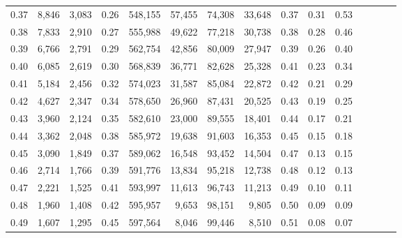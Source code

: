 \begin{tabular}{rrrcrrrrrrrrrrr}
0.37 &   8,846 &  3,083 &                                       0.26 &  548,155 &   57,455 &   74,308 &   33,648 &  0.37 &  0.31 &                         0.53 \\
0.38 &   7,833 &  2,910 &                                       0.27 &  555,988 &   49,622 &   77,218 &   30,738 &  0.38 &  0.28 &                         0.46 \\
0.39 &   6,766 &  2,791 &                                       0.29 &  562,754 &   42,856 &   80,009 &   27,947 &  0.39 &  0.26 &                         0.40 \\
0.40 &   6,085 &  2,619 &                                       0.30 &  568,839 &   36,771 &   82,628 &   25,328 &  0.41 &  0.23 &                         0.34 \\
0.41 &   5,184 &  2,456 &                                       0.32 &  574,023 &   31,587 &   85,084 &   22,872 &  0.42 &  0.21 &                         0.29 \\
0.42 &   4,627 &  2,347 &                                       0.34 &  578,650 &   26,960 &   87,431 &   20,525 &  0.43 &  0.19 &                         0.25 \\
0.43 &   3,960 &  2,124 &                                       0.35 &  582,610 &   23,000 &   89,555 &   18,401 &  0.44 &  0.17 &                         0.21 \\
0.44 &   3,362 &  2,048 &                                       0.38 &  585,972 &   19,638 &   91,603 &   16,353 &  0.45 &  0.15 &                         0.18 \\
0.45 &   3,090 &  1,849 &                                       0.37 &  589,062 &   16,548 &   93,452 &   14,504 &  0.47 &  0.13 &                         0.15 \\
0.46 &   2,714 &  1,766 &                                       0.39 &  591,776 &   13,834 &   95,218 &   12,738 &  0.48 &  0.12 &                         0.13 \\
0.47 &   2,221 &  1,525 &                                       0.41 &  593,997 &   11,613 &   96,743 &   11,213 &  0.49 &  0.10 &                         0.11 \\
0.48 &   1,960 &  1,408 &                                       0.42 &  595,957 &    9,653 &   98,151 &    9,805 &  0.50 &  0.09 &                         0.09 \\
0.49 &   1,607 &  1,295 &                                       0.45 &  597,564 &    8,046 &   99,446 &    8,510 &  0.51 &  0.08 &                         0.07 \\

\end{tabular}
